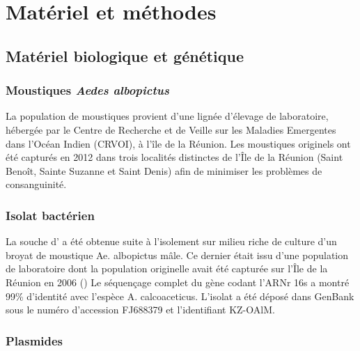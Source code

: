 \chapter{Matériel et méthodes}

\section{Matériel biologique et génétique}

\subsection{Moustiques \textit{Aedes albopictus}}
\label{par:moustiques}
La population de moustiques  provient d'une lignée d'élevage de laboratoire, hébergée par le Centre de Recherche et de Veille sur les Maladies Emergentes dans l'Océan Indien (CRVOI), à l’île de la Réunion.
Les moustiques originels ont été capturés en 2012 dans trois localités distinctes de l’Île de la Réunion (Saint Benoît, Sainte Suzanne et Saint Denis) afin de minimiser les problèmes de consanguinité.

\subsection{Isolat bactérien}
La souche d' a été obtenue suite à l’isolement sur milieu riche de culture d’un broyat de moustique Ae. albopictus mâle. Ce dernier était issu d’une population de laboratoire dont la population originelle avait été capturée sur l’Île de la Réunion en 2006 (\textcite{zouache2009})
Le séquençage complet du gène codant l’ARNr 16s a montré 99\% d’identité avec l’espèce A. calcoaceticus. L’isolat a été déposé dans GenBank sous le numéro d’accession FJ688379 et l’identifiant KZ-OAlM.

\subsection{Plasmides}

